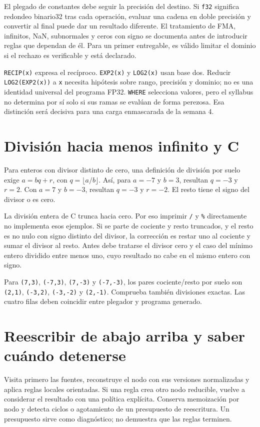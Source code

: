 \documentclass[12pt,a4paper,oneside]{report}
\begin{document}
El plegado de constantes debe seguir la precisión del destino. Si \texttt{f32} significa redondeo binario32 tras cada operación, evaluar una cadena en doble precisión y convertir al final puede dar un resultado diferente. El tratamiento de FMA, infinitos, NaN, subnormales y ceros con signo se documenta antes de introducir reglas que dependan de él. Para un primer entregable, es válido limitar el dominio si el rechazo es verificable y está declarado.

\texttt{RECIP(x)} expresa el recíproco. \texttt{EXP2(x)} y \texttt{LOG2(x)} usan base dos. Reducir \texttt{LOG2(EXP2(x))} a \texttt{x} necesita hipótesis sobre rango, precisión y dominio; no es una identidad universal del programa FP32. \texttt{WHERE} selecciona valores, pero el syllabus no determina por sí solo si sus ramas se evalúan de forma perezosa. Esa distinción será decisiva para una carga enmascarada de la semana 4.

\section{División hacia menos infinito y C}
Para enteros con divisor distinto de cero, una definición de división por suelo exige $a=bq+r$, con $q=\lfloor a/b\rfloor$. Así, para $a=-7$ y $b=3$, resultan $q=-3$ y $r=2$. Con $a=7$ y $b=-3$, resultan $q=-3$ y $r=-2$. El resto tiene el signo del divisor o es cero.

La división entera de C trunca hacia cero. Por eso imprimir \texttt{/} y \texttt{\%} directamente no implementa esos ejemplos. Si se parte de cociente y resto truncados, y el resto es no nulo con signo distinto del divisor, la corrección es restar uno al cociente y sumar el divisor al resto. Antes debe tratarse el divisor cero y el caso del mínimo entero dividido entre menos uno, cuyo resultado no cabe en el mismo entero con signo.

\begin{comprueba}
Para \texttt{(7,3)}, \texttt{(-7,3)}, \texttt{(7,-3)} y \texttt{(-7,-3)}, los pares cociente/resto por suelo son \texttt{(2,1)}, \texttt{(-3,2)}, \texttt{(-3,-2)} y \texttt{(2,-1)}. Comprueba también divisiones exactas. Las cuatro filas deben coincidir entre plegador y programa generado.

\end{comprueba}
\section{Reescribir de abajo arriba y saber cuándo detenerse}
Visita primero las fuentes, reconstruye el nodo con sus versiones normalizadas y aplica reglas locales orientadas. Si una regla crea otro nodo reducible, vuelve a considerar el resultado con una política explícita. Conserva memoización por nodo y detecta ciclos o agotamiento de un presupuesto de reescritura. Un presupuesto sirve como diagnóstico; no demuestra que las reglas terminen.
\end{document}

